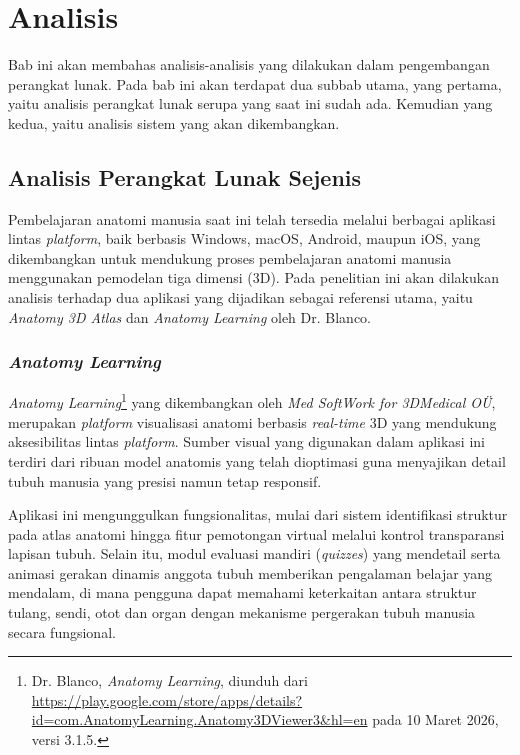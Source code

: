 \chapter{Analisis}
\label{ch:analisis}

Bab ini akan membahas analisis-analisis yang dilakukan dalam pengembangan perangkat lunak. Pada bab ini akan terdapat dua subbab utama, yang pertama, yaitu analisis perangkat lunak serupa yang saat ini sudah ada. Kemudian yang kedua, yaitu analisis sistem yang akan dikembangkan. 

\section{Analisis Perangkat Lunak Sejenis}
    Pembelajaran anatomi manusia saat ini telah tersedia melalui berbagai aplikasi lintas \textit{platform}, baik berbasis Windows, macOS, Android, maupun iOS, yang dikembangkan untuk mendukung proses pembelajaran anatomi manusia menggunakan pemodelan tiga dimensi (3D). Pada penelitian ini akan dilakukan analisis terhadap dua aplikasi yang dijadikan sebagai referensi utama, yaitu \textit{Anatomy 3D Atlas} dan \textit{Anatomy Learning} oleh Dr. Blanco.

   
     \subsection{\textit{Anatomy Learning}}
 
        \textit{Anatomy Learning}\footnote{Dr. Blanco, \textit{Anatomy Learning}, diunduh dari \url{https://play.google.com/store/apps/details?id=com.AnatomyLearning.Anatomy3DViewer3&hl=en} pada 10 Maret 2026, versi 3.1.5.} yang dikembangkan oleh 
        \textit{Med SoftWork for 3DMedical OÜ}, merupakan \textit{platform} 
        visualisasi anatomi berbasis \textit{real-time} 3D yang mendukung aksesibilitas 
        lintas \textit{platform}. Sumber visual yang digunakan dalam aplikasi ini 
        terdiri dari ribuan model anatomis yang telah dioptimasi guna menyajikan 
        detail tubuh manusia yang presisi namun tetap responsif.
       
       Aplikasi ini mengunggulkan fungsionalitas, mulai dari sistem identifikasi struktur pada atlas anatomi hingga fitur pemotongan virtual melalui kontrol transparansi lapisan tubuh. Selain itu, modul evaluasi mandiri (\textit{quizzes}) yang mendetail serta animasi gerakan dinamis anggota tubuh memberikan pengalaman belajar yang mendalam, di mana pengguna dapat memahami keterkaitan antara struktur tulang, sendi, otot dan organ dengan mekanisme pergerakan tubuh manusia secara fungsional.
        

